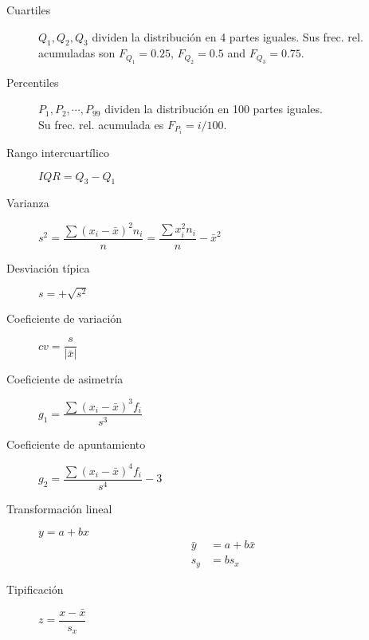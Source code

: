 \begin{multicols*}{2}
\begin{tcolorbox}[hbox, title=Estadísticos de posición]
\begin{minipage}{0.4\textwidth}
\begin{description}
\item [Cuartiles] $Q_1,Q_2,Q_3$ dividen la distribución en 4 partes iguales.
      Sus frec. rel. acumuladas son
      $F_{Q_1}=0.25$, $F_{Q_2}=0.5$ and $F_{Q_3}=0.75$.
\item [Percentiles] $P_1,P_2,\cdots,P_{99}$ dividen la distribución en 100 partes iguales.\\
      Su frec. rel. acumulada es $F_{P_i}=i/100$.
\end{description}
\end{minipage}
\end{tcolorbox}

\begin{tcolorbox}[hbox, title=Estadísticos de dispersión]
\begin{minipage}{0.4\textwidth}
\begin{description}
\item [Rango intercuartílico] $IQR=Q_3-Q_1$
\item [Varianza] $s^2=\dfrac{\sum (x_i-\bar x)^2n_i}{n}=\dfrac{\sum x_i^2n_i}{n}-\bar x^2$
\item [Desviación típica] $s=+\sqrt{s^2}$
\item [Coeficiente de variación] $cv=\dfrac{s}{|\bar{x}|}$
\end{description}
\end{minipage}
\end{tcolorbox}

\begin{tcolorbox}[hbox, title=Estadísticos de forma]
\begin{minipage}{0.4\textwidth}
\begin{description}
\item [Coeficiente de asimetría] $g_1=\dfrac{\sum(x_i-\bar{x})^3f_i}{s^3}$
\item [Coeficiente de apuntamiento] $g_2=\dfrac{\sum(x_i-\bar{x})^4f_i}{s^4}-3$
\end{description}
\end{minipage}
\end{tcolorbox}

\begin{tcolorbox}[hbox, title=Transformaciones lineales]
\begin{minipage}{0.4\textwidth}
\begin{description}
\item[Transformación lineal] $y=a+bx$
      \begin{align*}
      \bar y & = a+b\bar x \\
      s_y    & = bs_x
      \end{align*}
\item[Tipificación] $z=\dfrac{x-\bar x}{s_x}$
\end{description}
\end{minipage}
\end{tcolorbox}



\end{multicols*}
